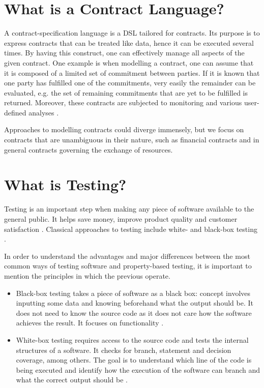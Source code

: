 \documentclass{ituthesis}
\begin{document}
\section{What is a Contract Language?}
A contract-specification language is a DSL tailored for contracts. Its purpose is to express contracts that can be treated like data, hence it can be executed several times. By having this construct, one can effectively manage all aspects of the given contract. One example is when modelling a contract, one can assume that it is composed of a limited set of commitment between parties. If it is known that one party has fulfilled one of the commitments, very easily the remainder can be evaluated, e.g. the set of remaining commitments that are yet to be fulfilled is returned. Moreover, these contracts are subjected to monitoring and various user-defined analyses \cite{andersen2006compositional}.

Approaches to modelling contracts could diverge immensely, but we focus on contracts that are unambiguous in their nature, such as financial contracts and in general contracts governing the exchange of resources.

\section{What is Testing?} %
Testing is an important step when making any piece of software available to the general public. It helps save money, improve product quality and customer satisfaction \cite{4reasonstesting}.
Classical approaches to testing include white- and black-box testing \cite{testing}.

In order to understand the advantages and major differences between the most common ways of testing software and property-based testing, it is important to mention the principles in which the previous operate.
\begin{itemize}
    \item Black-box testing takes a piece of software as a black box: concept involves inputting some data and knowing beforehand what the output should be. It does not need to know the source code as it does not care how the software achieves the result. It focuses on functionality \cite{testing}.
    \item White-box testing requires access to the source code and tests the internal structures of a software. It checks for branch, statement and decision coverage, among others. The goal is to understand which line of the code is being executed and identify how the execution of the software can branch and what the correct output should be \cite{williams2006white}.
\end{itemize}
\end{document}
